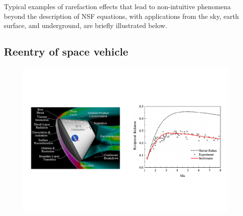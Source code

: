 Typical examples of rarefaction effects that lead to non-intuitive phenomena beyond the description of NSF equations, with applications from the sky, earth surface, and underground, are briefly illustrated below.  

\subsection{Reentry of space vehicle}


\begin{figure}[t]
	\centering
	\includegraphics[scale=0.5]{Introduction/IMG/Re_entry.pdf}
	\vskip 0.5cm

\end{figure}
